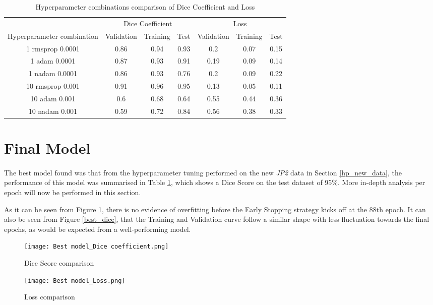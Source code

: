 \begin{table}[ht!] 
    \begin{center}
    \begin{tabular}{ccccccc} 
    \toprule
       & \multicolumn{3}{c}{Dice Coefficient}     & \multicolumn{3}{c}{Loss} \\
    Hyperparameter combination & Validation & Training & Test & Validation    & Training    & Test   \\ \midrule
    1 rmsprop 0.0001 & 0.86 & 0.94 & 0.93 & 0.2 & 0.07 & 0.15  \\ 1 adam 0.0001 & 0.87 & 0.93 & 0.91 & 0.19 & 0.09 & 0.14  \\ 1 nadam 0.0001 & 0.86 & 0.93 & 0.76 & 0.2 & 0.09 & 0.22  \\ \rowcolor{lightgray}10 rmsprop 0.001 & 0.91 & 0.96 & 0.95 & 0.13 & 0.05 & 0.11  \\ 10 adam 0.001 & 0.6 & 0.68 & 0.64 & 0.55 & 0.44 & 0.36  \\ 10 nadam 0.001 & 0.59 & 0.72 & 0.84 & 0.56 & 0.38 & 0.33  \\
\bottomrule
    \end{tabular}
  \end{center} 
  \caption{Hyperparameter combinations comparison of Dice Coefficient and Loss}\label{tab_hp}
\end{table}

\section{Final Model}
\paragraph{}
The best model found was that from the hyperparameter tuning performed on the new \textit{JP2} data in Section \ref{hp_new_data}, the performance of this model was summarised in Table \ref{tab_hp}, which shows a Dice Score on the test dataset of $95\%$. More in-depth analysis per epoch will now be performed in this section.

As it can be seen from Figure \ref{best_loss}, there is no evidence of overfitting before the Early Stopping strategy kicks off at the 88th epoch. It can also be seen from Figure \ref{best_dice}, that the Training and Validation curve follow a similar shape with less fluctuation towards the final epochs, as would be expected from a well-performing model.

\begin{figure}[hbt!]
    \begin{minipage}[c]{0.5\linewidth}
    \texttt{[image: Best model\_Dice coefficient.png]}
    \caption{Dice Score comparison}
    \label{best_dice}
    \end{minipage}
        \hfill
        \begin{minipage}[c]{0.5\linewidth}
        \texttt{[image: Best model\_Loss.png]}
        \caption{Loss
        comparison}
        \label{best_loss}
    \end{minipage}
\end{figure}

